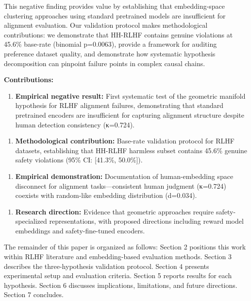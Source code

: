 This negative finding provides value by establishing that embedding-space clustering approaches using standard pretrained models are insufficient for alignment evaluation. Our validation protocol makes methodological contributions: we demonstrate that HH-RLHF contains genuine violations at 45.6\% base-rate (binomial p=0.0063), provide a framework for auditing preference dataset quality, and demonstrate how systematic hypothesis decomposition can pinpoint failure points in complex causal chains.

\textbf{Contributions:}

\begin{enumerate}
\item \textbf{Empirical negative result:} First systematic test of the geometric manifold hypothesis for RLHF alignment failures, demonstrating that standard pretrained encoders are insufficient for capturing alignment structure despite human detection consistency (κ=0.724).
\end{enumerate}

\begin{enumerate}
\item \textbf{Methodological contribution:} Base-rate validation protocol for RLHF datasets, establishing that HH-RLHF harmless subset contains 45.6\% genuine safety violations (95\% CI: [41.3\%, 50.0\%]).
\end{enumerate}

\begin{enumerate}
\item \textbf{Empirical demonstration:} Documentation of human-embedding space disconnect for alignment tasks—consistent human judgment (κ=0.724) coexists with random-like embedding distribution (d=0.034).
\end{enumerate}

\begin{enumerate}
\item \textbf{Research direction:} Evidence that geometric approaches require safety-specialized representations, with proposed directions including reward model embeddings and safety-fine-tuned encoders.
\end{enumerate}

The remainder of this paper is organized as follows: Section 2 positions this work within RLHF literature and embedding-based evaluation methods. Section 3 describes the three-hypothesis validation protocol. Section 4 presents experimental setup and evaluation criteria. Section 5 reports results for each hypothesis. Section 6 discusses implications, limitations, and future directions. Section 7 concludes.
